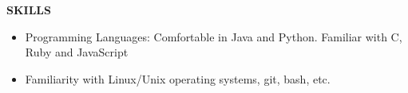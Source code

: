 \documentclass[10pt, letterpaper]{article}
\begin{document}
\textbf{SKILLS}
\smallskip 
\begin{itemize}
\item Programming Languages: Comfortable in Java and Python. Familiar with C, Ruby and JavaScript
\item Familiarity with Linux/Unix operating systems, git, bash, etc.
\end{itemize} 

\end{document}
